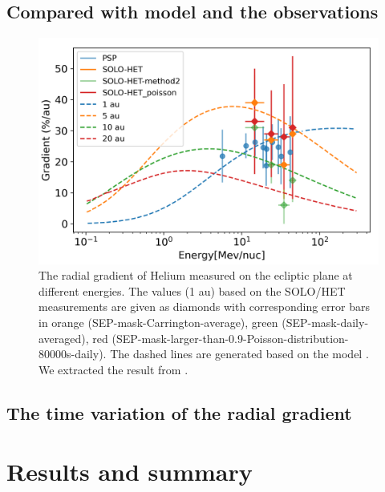 \subsection{Compared with model and the observations}
\begin{figure}
    \centering
    \includegraphics{images/ACR/Gradient_Energy_distribution_v2}
    \caption{The radial gradient of Helium measured on the ecliptic plane at different energies. The values (1 au) based on the SOLO/HET measurements are given as diamonds with corresponding error bars in orange (SEP-mask-Carrington-average), green (SEP-mask-daily-averaged), red (SEP-mask-larger-than-0.9-Poisson-distribution-80000s-daily). The dashed lines are generated based on the model \citep{Strauss&Potgieter_2010} . We extracted the result from \citep{Rankin2021ApJ}.  }
    \label{fig:comparison_SOLO_PSP}
\end{figure}


\subsection{The time variation of the radial gradient}


\section{Results and summary}


